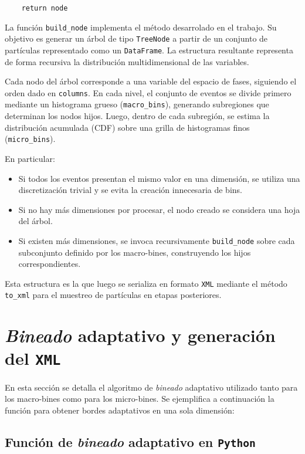 \begin{verbatim}
    return node
\end{verbatim}

\noindent La función \texttt{build\_node} implementa el método desarrolado en el trabajo. Su objetivo es generar un árbol de tipo \texttt{TreeNode} a partir de un conjunto de partículas representado como un \texttt{DataFrame}. La estructura resultante representa de forma recursiva la distribución multidimensional de las variables.

Cada nodo del árbol corresponde a una variable del espacio de fases, siguiendo el orden dado en \texttt{columns}. En cada nivel, el conjunto de eventos se divide primero mediante un histograma grueso (\texttt{macro\_bins}), generando subregiones que determinan los nodos hijos. Luego, dentro de cada subregión, se estima la distribución acumulada (CDF) sobre una grilla de histogramas finos (\texttt{micro\_bins}).

En particular:
\begin{itemize}
    \item Si todos los eventos presentan el mismo valor en una dimensión, se utiliza una discretización trivial y se evita la creación innecesaria de bins.
    \item Si no hay más dimensiones por procesar, el nodo creado se considera una hoja del árbol.
    \item Si existen más dimensiones, se invoca recursivamente \texttt{build\_node} sobre cada subconjunto definido por los macro-bines, construyendo los hijos correspondientes.
\end{itemize}

Esta estructura es la que luego se serializa en formato \texttt{XML} mediante el método \texttt{to\_xml} para el muestreo de partículas en etapas posteriores.

\section{\textit{Bineado} adaptativo y generación del \texttt{XML}}\label{sec:bineado_adaptativo}

En esta sección se detalla el algoritmo de \textit{bineado} adaptativo utilizado tanto para los macro-bines como para los micro-bines. Se ejemplifica a continuación la función para obtener bordes adaptativos en una sola dimensión:

\subsection{Función de \textit{bineado} adaptativo en \texttt{Python}}

